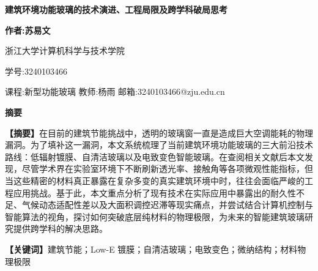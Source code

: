 \documentclass[UTF8,10pt,a4paper,fontset=none]{ctexart}
\begin{document}
\begin{center}
{\color{rscblue}\sffamily\bfseries 建筑环境功能玻璃的技术演进、工程局限及跨学科破局思考\par}
\vspace{1.5em}
{\large \sffamily\textbf{作者:苏易文}\par}
\vspace{0.5em}
{\small 浙江大学计算机科学与技术学院\par}
\vspace{0.5em}
{\small 学号:3240103466\par}
\vspace{1.5em}
{\small 课程:新型功能玻璃 \qquad 教师:杨雨 \qquad 邮箱:3240103466@zju.edu.cn\par}
\end{center}

\vspace{1.5em}

\begin{center}
{\color{rscblue}\bfseries\sffamily 摘\quad 要}
\end{center}
{\small\justifying\noindent
\textbf{\color{rscblue}【摘要】}在目前的建筑节能挑战中，透明的玻璃窗一直是造成巨大空调能耗的物理漏洞。为了填补这一漏洞，本文系统梳理了当前建筑环境功能玻璃的三大前沿技术路线：低辐射镀膜、自清洁玻璃以及电致变色智能玻璃。在查阅相关文献后本文发现，尽管学术界在实验室环境下不断刷新透光率、接触角等各项微观性能指标，但当这些精密的材料真正暴露在复杂多变的真实建筑环境中时，往往会面临严峻的工程应用挑战。基于此，本文重点分析了现有技术在实际应用中暴露出的耐久性不足、气候动态适配性差以及大面积调控迟滞等现实痛点，并尝试结合计算机控制与智能算法的视角，探讨如何突破底层纯材料的物理极限，为未来的智能建筑玻璃研究提供跨学科的解决思路。
\par}

\vspace{0.8em}
{\small\justifying\noindent
\textbf{\color{rscblue}【关键词】}建筑节能；Low-E 镀膜；自清洁玻璃；电致变色；微纳结构；材料物理极限
\par}

\vspace{1.5em}
\end{document}
